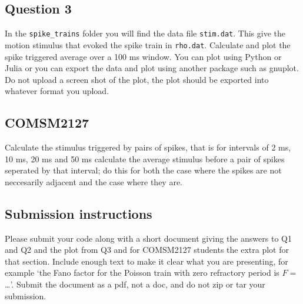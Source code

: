 \documentclass[12pt]{article}
\begin{document}
\subsection*{Question 3} 

In the \texttt{spike\_trains} folder you will find the data file
\texttt{stim.dat}. This give the motion stimulus that evoked the spike
train in \texttt{rho.dat}. Calculate and plot the spike triggered
average over a 100 ms window. You can plot using Python or Julia or
you can export the data and plot using another package such as
gnuplot. Do not upload a screen shot of the plot, the plot should be
exported into whatever format you upload.

\subsection*{COMSM2127}

Calculate the stimulus triggered by pairs of spikes, that is for
intervals of 2 ms, 10 ms, 20 ms and 50 ms calculate the average
stimulus before a pair of spikes seperated by that interval; do this
for both the case where the spikes are not neccesarily adjacent and
the case where they are.

\subsection*{Submission instructions}

Please submit your code along with a short document giving the answers
to Q1 and Q2 and the plot from Q3 and for COMSM2127 students the extra
plot for that section. Include enough text to make it clear what you
are presenting, for example \lq{}the Fano factor for the Poisson train
with zero refractory period is $F=$\ldots\rq{}. Submit the document as
a pdf, not a doc, and do not zip or tar your submission.
\end{document}
